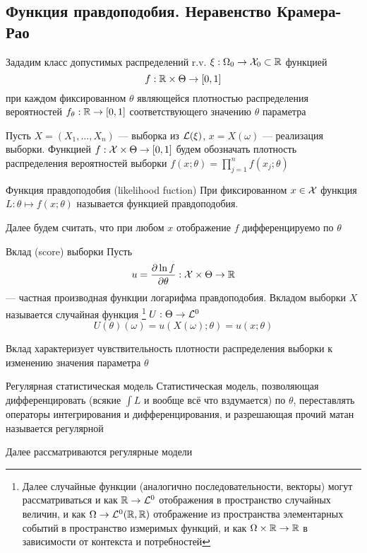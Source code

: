 \subsection{Функция правдоподобия. Неравенство Крамера-Рао}

Зададим класс допустимых распределений r.v. $\xi:\Omega_0\to\mathcal X_0\subset\mathbb R$
функцией $$f: \mathbb R\times\Theta\to\left[{0, 1}\right]$$
при каждом фиксированном $\theta$ являющейся
плотностью распределения вероятностей $f_\theta: \mathbb R\to\left[{0, 1}\right]$
соответствующего значению $\theta$ параметра

Пусть $X = (X_1, \dotsc, X_n)$ --- выборка из $\mathcal L(\xi)$,
$x = X(\omega)$ --- реализация выборки.
Функцией $f:\mathcal X\times\Theta\to\left[{0, 1}\right]$
будем обозначать плотность распределения вероятностей выборки
$f(x; \theta) = \prod_{j=1}^n f(x_j; \theta)$

\begin{dfn}{Функция правдоподобия (likelihood fuction)}
При фиксированном $x\in\mathcal X$
функция $L: \theta\mapsto f(x;\theta)$ называется функцией правдоподобия.

Далее будем считать,
что при любом $x$
отображение $f$ дифференцируемо по $\theta$
\end{dfn}

\begin{dfn}{Вклад (score) выборки}
Пусть $$u = \frac{\partial\ln f}{\partial\theta}:\mathcal X\times\Theta\to\mathbb R$$
--- частная производная функции логарифма правдоподобия.
Вкладом выборки $X$
называется случайная функция%
\footnote{Далее случайные функции (аналогично последовательности, векторы)
могут рассматриваться
и как $\mathbb R\to\mathcal L^{0}$ отображения в пространство случайных величин,
и как $\Omega\to\mathcal L^{0}(\mathbb R,\mathbb R)$
отображение из пространства элементарных событий в пространство измеримых функций,
и как $\Omega\times\mathbb R\to\mathbb R$
в зависимости от контекста и потребностей}
$U:\Theta\to\mathcal L^{0}$
$$U(\theta)(\omega) = u(X(\omega);\theta) = u(x;\theta)$$

Вклад характеризует чувствительность плотности распределения выборки
к изменению значения параметра $\theta$
\end{dfn}

\begin{dfn}{Регулярная статистическая модель}
Статистическая модель,
позволяющая
дифференцировать (всякие $\int L$ и вообще всё что вздумается) по $\theta$,
переставлять операторы интегрирования и дифференцирования,
и разрешающая прочий матан называется регулярной

Далее рассматриваются регулярные модели
\end{dfn}

